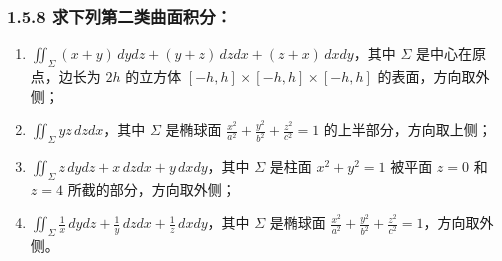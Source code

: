 \documentclass[12pt]{ctexart}
\begin{document}
\subsubsection*{1.5.8 求下列第二类曲面积分：}
\begin{enumerate}
    \item $\iint_{\Sigma} (x + y) \, dy dz + (y + z) \, dz dx + (z + x) \, dx dy$，其中 $\Sigma$ 是中心在原点，边长为 $2h$ 的立方体 $[-h, h] \times [-h, h] \times [-h, h]$ 的表面，方向取外侧；
    \item $\iint_{\Sigma} yz \, dz dx$，其中 $\Sigma$ 是椭球面 $\frac{x^2}{a^2} + \frac{y^2}{b^2} + \frac{z^2}{c^2} = 1$ 的上半部分，方向取上侧；
    \item $\iint_{\Sigma} z \, dy dz + x \, dz dx + y \, dx dy$，其中 $\Sigma$ 是柱面 $x^2 + y^2 = 1$ 被平面 $z = 0$ 和 $z = 4$ 所截的部分，方向取外侧；
    \item $\iint_{\Sigma} \frac{1}{x} \, dy dz + \frac{1}{y} \, dz dx + \frac{1}{z} \, dx dy$，其中 $\Sigma$ 是椭球面 $\frac{x^2}{a^2} + \frac{y^2}{b^2} + \frac{z^2}{c^2} = 1$，方向取外侧。
\end{enumerate}
\end{document}
